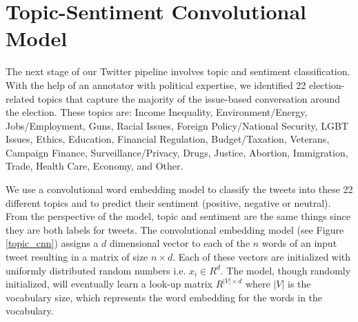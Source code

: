 \documentclass[letterpaper]{article}
\begin{document}
%


\section{Topic-Sentiment Convolutional Model}
The next stage of our Twitter pipeline involves topic and sentiment classification. With the help of an annotator with political expertise, we identified 22 election-related topics that capture the majority of the issue-based conversation around the election. These topics are: Income Inequality, Environment/Energy, Jobs/Employment, Guns, Racial Issues, Foreign Policy/National Security, LGBT Issues, Ethics, Education, Financial Regulation, Budget/Taxation, Veterans, Campaign Finance, Surveillance/Privacy, Drugs, Justice, Abortion, Immigration, Trade, Health Care, Economy, and Other.

We use a convolutional word embedding model to classify the tweets into these 22 different topics and to predict their sentiment (positive, negative or neutral). From the perspective of the model, topic and sentiment are the same things since they are both labels for tweets. The convolutional embedding model (see Figure \ref{topic_cnn}) assigns a $d$ dimensional
vector to each of the $n$ words of an input tweet resulting in a matrix of size $n \times d$. Each of these vectors are initialized with uniformly distributed random numbers i.e. $x_i \in {R}^d$. The model, though randomly initialized, will eventually learn a look-up matrix ${R}^{|V|\times d}$ where $|V|$ is the vocabulary size, which represents the word embedding for the words in the vocabulary. 
\end{document}
